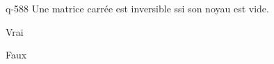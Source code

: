\begin{truefalse}{q-588}
Une matrice carrée est inversible ssi son noyau est vide.
\item Vrai
\item* Faux
\end{truefalse}

